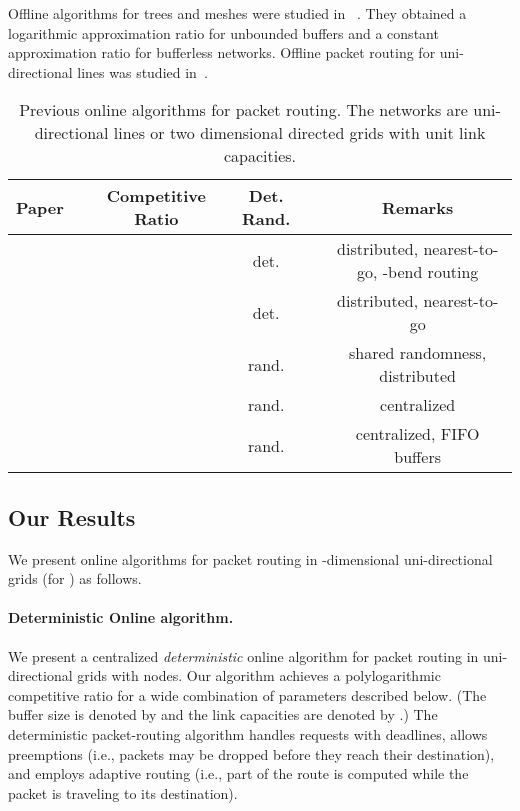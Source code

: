 \documentclass[11pt]{article}
\newenvironment{proof sketch}[1]{\noindent {\emph{Proof sketch of #1:}}}{\hfill \qed}
\begin{document}
Offline algorithms for trees and meshes were studied in~\cite{AKRR} . They obtained a
logarithmic approximation ratio for unbounded buffers and a constant approximation
ratio for bufferless networks. Offline packet routing for uni-directional lines was
studied in~\cite{RR}.

\renewcommand{\arraystretch}{1.3}
\begin{table}
\begin{centering}
\begin{tabular}{|c|c|c|c|c|c|}
\hline
Paper &  & Competitive Ratio  & Det.  Rand.&  & Remarks \tabularnewline
\hline
\hline
\cite{AKK}  &  &   & det. &  &  distributed, nearest-to-go,
-bend routing\tabularnewline
\cite{AKK}  &  &   &det.  &  & distributed, nearest-to-go\tabularnewline
\cite{AKK}  &  &   &rand.  &  & shared randomness, distributed\tabularnewline
\cite{AKK}  &  &   &rand.  &  &  centralized\tabularnewline
\cite{AZ}   &  &  & rand. &   &  centralized, FIFO buffers\tabularnewline
\hline
\end{tabular}
\par\end{centering}
\caption{Previous online algorithms for packet routing. The networks are
  uni-directional lines or two dimensional directed grids with
  unit link capacities.}
\label{table:previous work}
\end{table}
\renewcommand{\arraystretch}{1}

\subsection{Our Results}
We present online algorithms for packet routing in
-dimensional uni-directional grids (for ) as
follows.

\paragraph{Deterministic Online algorithm.}
We present a centralized \emph{deterministic} online
algorithm for packet routing in uni-directional grids with
 nodes. Our algorithm achieves a polylogarithmic
competitive ratio for a wide combination of parameters
described below. (The buffer size is denoted by  and the
link capacities are denoted by .) The deterministic
packet-routing algorithm handles requests with deadlines,
allows  preemptions (i.e., packets may be dropped before
they reach their destination), and employs adaptive routing
(i.e., part of the route is computed while the packet is
traveling to its destination).
\end{document}
